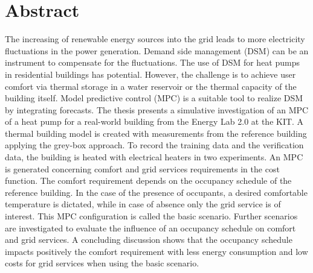 
\chapter{Abstract}

The increasing of renewable energy sources into the grid leads to more electricity fluctuations in the power generation. Demand side management (DSM) can be an instrument to compensate for the fluctuations. The use of DSM for heat pumps in residential buildings has potential. However, the challenge is to achieve user comfort via thermal storage in a water reservoir or the thermal capacity of the building itself. Model predictive control (MPC) is a suitable tool to realize DSM by integrating forecasts.\newline
The thesis presents a simulative investigation of an MPC of a heat pump for a real-world building from the Energy Lab 2.0 at the KIT. A thermal building model is created with measurements from the reference building applying the grey-box approach. To record the training data and the verification data, the building is heated with electrical heaters in two experiments.\newline
An MPC is generated concerning comfort and grid services requirements in the cost function. The comfort requirement depends on the occupancy schedule of the reference building. In the case of the presence of occupants, a desired comfortable temperature is dictated, while in case of absence only the grid service is of interest. This MPC configuration is called the basic scenario. Further scenarios are investigated to evaluate the influence of an occupancy schedule on comfort and grid services. A concluding discussion shows that the occupancy schedule impacts positively the comfort requirement with less energy consumption and low costs for grid services when using the basic scenario.